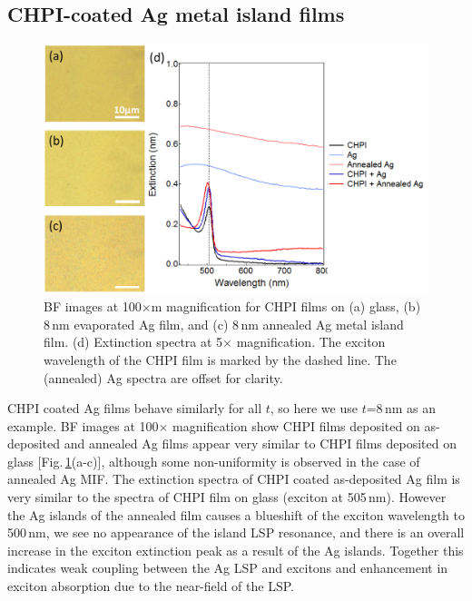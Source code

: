 \subsection{CHPI-coated Ag metal island films}
\begin{figure}[ht] 
\centering    
\includegraphics[width=\textwidth]{Fig7}
\caption{BF images at 100$\times$m magnification for CHPI films on (a) glass, (b) 8\,nm evaporated Ag film, and (c) 8\,nm annealed Ag metal island film. (d) Extinction spectra at 5$\times$ magnification. The exciton wavelength of the CHPI film is marked by the dashed line. The (annealed) Ag spectra are offset for clarity.}
\label{6Fig7}
\end{figure}
CHPI coated Ag films behave similarly for all $t$, so here we use $t$=8\,nm as an example. BF images at 100$\times$ magnification show CHPI films deposited on as-deposited and annealed Ag films appear very similar to CHPI films deposited on glass [Fig.\,\ref{6Fig7}(a-c)], although some non-uniformity is observed in the case of annealed Ag MIF. The extinction spectra of CHPI coated as-deposited Ag film is very similar to the spectra of CHPI film on glass (exciton at 505\,nm). However the Ag islands of the annealed film causes a blueshift of the exciton wavelength to 500\,nm, we see no appearance of the island LSP resonance, and there is an overall increase in the exciton extinction peak as a result of the Ag islands. Together this indicates weak coupling between the Ag LSP and excitons and enhancement in exciton absorption due to the near-field of the LSP. 

